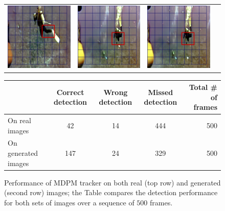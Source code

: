 \documentclass[letterpaper, 10pt, conference]{ieeeconf}
\begin{document}
\begin{figure}
\begin{tabular}{p{4.0cm} p{4.0cm} p{4.0cm} p{4.0cm}}
   \includegraphics[width=1.7in]{mdpm/gen2} &
   \includegraphics[width=1.7in]{mdpm/gen3} &
   \includegraphics[width=1.7in]{mdpm/gen4} \\
\end{tabular}
\vspace{4mm}

\begin{tabular}{l|c|c|c|r|}
 \cline{2-5}
 &  Correct detection & Wrong detection & Missed detection & Total \# of frames\\ \hline  \cline{2-4}
On real images  &  42 & 14 & 444 & 500  \\ \hline
On generated images  &  147 & 24 & 329 & 500  \\ \hline
\end{tabular}

\caption{Performance of MDPM tracker \cite{islam2017mixed} on both real (top row) and generated (second row) images; the Table compares the detection performance for both sets of images over a sequence of $500$ frames.   }
\label{mdpmStuff}
\end{figure}


\end{document}
